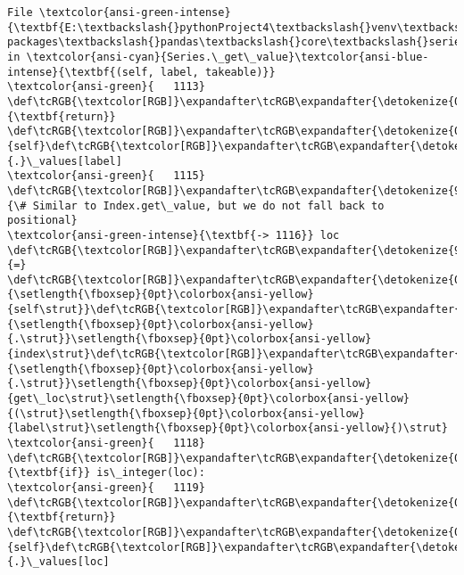 \documentclass[11pt]{ctexart}
\begin{document}
\begin{Verbatim}[commandchars=\\\{\}, frame=single, framerule=2mm, rulecolor=\color{outerrorbackground}]
File \textcolor{ansi-green-intense}{\textbf{E:\textbackslash{}pythonProject4\textbackslash{}venv\textbackslash{}lib\textbackslash{}site-packages\textbackslash{}pandas\textbackslash{}core\textbackslash{}series.py:1116}}, in \textcolor{ansi-cyan}{Series.\_get\_value}\textcolor{ansi-blue-intense}{\textbf{(self, label, takeable)}}
\textcolor{ansi-green}{   1113}     \def\tcRGB{\textcolor[RGB]}\expandafter\tcRGB\expandafter{\detokenize{0,135,0}}{\textbf{return}} \def\tcRGB{\textcolor[RGB]}\expandafter\tcRGB\expandafter{\detokenize{0,135,0}}{self}\def\tcRGB{\textcolor[RGB]}\expandafter\tcRGB\expandafter{\detokenize{98,98,98}}{.}\_values[label]
\textcolor{ansi-green}{   1115} \def\tcRGB{\textcolor[RGB]}\expandafter\tcRGB\expandafter{\detokenize{95,135,135}}{\# Similar to Index.get\_value, but we do not fall back to positional}
\textcolor{ansi-green-intense}{\textbf{-> 1116}} loc \def\tcRGB{\textcolor[RGB]}\expandafter\tcRGB\expandafter{\detokenize{98,98,98}}{=} \def\tcRGB{\textcolor[RGB]}\expandafter\tcRGB\expandafter{\detokenize{0,135,0}}{\setlength{\fboxsep}{0pt}\colorbox{ansi-yellow}{self\strut}}\def\tcRGB{\textcolor[RGB]}\expandafter\tcRGB\expandafter{\detokenize{98,98,98}}{\setlength{\fboxsep}{0pt}\colorbox{ansi-yellow}{.\strut}}\setlength{\fboxsep}{0pt}\colorbox{ansi-yellow}{index\strut}\def\tcRGB{\textcolor[RGB]}\expandafter\tcRGB\expandafter{\detokenize{98,98,98}}{\setlength{\fboxsep}{0pt}\colorbox{ansi-yellow}{.\strut}}\setlength{\fboxsep}{0pt}\colorbox{ansi-yellow}{get\_loc\strut}\setlength{\fboxsep}{0pt}\colorbox{ansi-yellow}{(\strut}\setlength{\fboxsep}{0pt}\colorbox{ansi-yellow}{label\strut}\setlength{\fboxsep}{0pt}\colorbox{ansi-yellow}{)\strut}
\textcolor{ansi-green}{   1118} \def\tcRGB{\textcolor[RGB]}\expandafter\tcRGB\expandafter{\detokenize{0,135,0}}{\textbf{if}} is\_integer(loc):
\textcolor{ansi-green}{   1119}     \def\tcRGB{\textcolor[RGB]}\expandafter\tcRGB\expandafter{\detokenize{0,135,0}}{\textbf{return}} \def\tcRGB{\textcolor[RGB]}\expandafter\tcRGB\expandafter{\detokenize{0,135,0}}{self}\def\tcRGB{\textcolor[RGB]}\expandafter\tcRGB\expandafter{\detokenize{98,98,98}}{.}\_values[loc]


\end{Verbatim}
\end{document}
